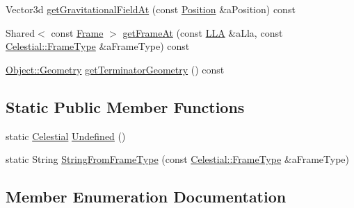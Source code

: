 \begin{DoxyCompactItemize}
\item 
Vector3d \hyperlink{classlibrary_1_1physics_1_1env_1_1obj_1_1_celestial_ac715a5cc62581070d55ab839e3309c9e}{get\+Gravitational\+Field\+At} (const \hyperlink{classlibrary_1_1physics_1_1coord_1_1_position}{Position} \&a\+Position) const
\item 
Shared$<$ const \hyperlink{classlibrary_1_1physics_1_1coord_1_1_frame}{Frame} $>$ \hyperlink{classlibrary_1_1physics_1_1env_1_1obj_1_1_celestial_ad1dfffd88b216eccf83a9441cae304be}{get\+Frame\+At} (const \hyperlink{classlibrary_1_1physics_1_1coord_1_1spherical_1_1_l_l_a}{L\+LA} \&a\+Lla, const \hyperlink{classlibrary_1_1physics_1_1env_1_1obj_1_1_celestial_a8585fb32125cb6c73ae1339a5ea09c79}{Celestial\+::\+Frame\+Type} \&a\+Frame\+Type) const
\item 
\hyperlink{classlibrary_1_1physics_1_1env_1_1_object_abdf50733c7ad97327fb64edca5670f13}{Object\+::\+Geometry} \hyperlink{classlibrary_1_1physics_1_1env_1_1obj_1_1_celestial_aa910ed14605693ee5af68d88015cd53b}{get\+Terminator\+Geometry} () const
\end{DoxyCompactItemize}
\subsection*{Static Public Member Functions}
\begin{DoxyCompactItemize}
\item 
static \hyperlink{classlibrary_1_1physics_1_1env_1_1obj_1_1_celestial}{Celestial} \hyperlink{classlibrary_1_1physics_1_1env_1_1obj_1_1_celestial_a5e33230d05d77f5e1132151ecf5e94e9}{Undefined} ()
\item 
static String \hyperlink{classlibrary_1_1physics_1_1env_1_1obj_1_1_celestial_a020864aa551a1ec6f5674cc2e166b131}{String\+From\+Frame\+Type} (const \hyperlink{classlibrary_1_1physics_1_1env_1_1obj_1_1_celestial_a8585fb32125cb6c73ae1339a5ea09c79}{Celestial\+::\+Frame\+Type} \&a\+Frame\+Type)
\end{DoxyCompactItemize}


\subsection{Member Enumeration Documentation}
\mbox{\label{classlibrary_1_1physics_1_1env_1_1obj_1_1_celestial_a8585fb32125cb6c73ae1339a5ea09c79}} 
